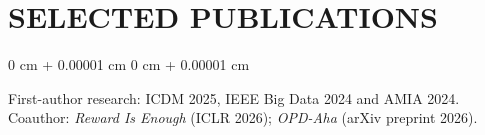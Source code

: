 \documentclass[10pt, letterpaper]{article}
\newenvironment{onecolentry}{
    \begin{adjustwidth}{
        0 cm + 0.00001 cm
    }{
        0 cm + 0.00001 cm
    }
}{
    \end{adjustwidth}
} %
\begin{document}
\section{SELECTED PUBLICATIONS}
\begin{onecolentry}
First-author research: ICDM 2025, IEEE Big Data 2024 and AMIA 2024. Coauthor: \textit{Reward Is Enough} (ICLR 2026); \textit{OPD-Aha} (arXiv preprint 2026).
\end{onecolentry}
\end{document}
